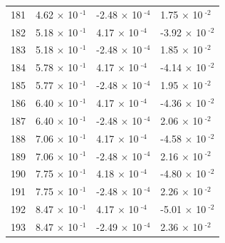 \documentclass[a4paper,11pt]{article}
\begin{document}
\begin{center}
\begin{longtable}{|R{1.5cm}|R{2.5cm}|R{2.5cm}|R{2.5cm}|}
  181 &         4.62 $\times$ 10$^{\text{          -1}}$  &        -2.48 $\times$ 10$^{\text{          -4}}$  &         1.75 $\times$ 10$^{\text{          -2}}$ \\ 
  182 &         5.18 $\times$ 10$^{\text{          -1}}$  &         4.17 $\times$ 10$^{\text{          -4}}$  &        -3.92 $\times$ 10$^{\text{          -2}}$ \\ 
  183 &         5.18 $\times$ 10$^{\text{          -1}}$  &        -2.48 $\times$ 10$^{\text{          -4}}$  &         1.85 $\times$ 10$^{\text{          -2}}$ \\ 
  184 &         5.78 $\times$ 10$^{\text{          -1}}$  &         4.17 $\times$ 10$^{\text{          -4}}$  &        -4.14 $\times$ 10$^{\text{          -2}}$ \\ 
  185 &         5.77 $\times$ 10$^{\text{          -1}}$  &        -2.48 $\times$ 10$^{\text{          -4}}$  &         1.95 $\times$ 10$^{\text{          -2}}$ \\ 
  186 &         6.40 $\times$ 10$^{\text{          -1}}$  &         4.17 $\times$ 10$^{\text{          -4}}$  &        -4.36 $\times$ 10$^{\text{          -2}}$ \\ 
  187 &         6.40 $\times$ 10$^{\text{          -1}}$  &        -2.48 $\times$ 10$^{\text{          -4}}$  &         2.06 $\times$ 10$^{\text{          -2}}$ \\ 
  188 &         7.06 $\times$ 10$^{\text{          -1}}$  &         4.17 $\times$ 10$^{\text{          -4}}$  &        -4.58 $\times$ 10$^{\text{          -2}}$ \\ 
  189 &         7.06 $\times$ 10$^{\text{          -1}}$  &        -2.48 $\times$ 10$^{\text{          -4}}$  &         2.16 $\times$ 10$^{\text{          -2}}$ \\ 
  190 &         7.75 $\times$ 10$^{\text{          -1}}$  &         4.18 $\times$ 10$^{\text{          -4}}$  &        -4.80 $\times$ 10$^{\text{          -2}}$ \\ 
  191 &         7.75 $\times$ 10$^{\text{          -1}}$  &        -2.48 $\times$ 10$^{\text{          -4}}$  &         2.26 $\times$ 10$^{\text{          -2}}$ \\ 
  192 &         8.47 $\times$ 10$^{\text{          -1}}$  &         4.17 $\times$ 10$^{\text{          -4}}$  &        -5.01 $\times$ 10$^{\text{          -2}}$ \\ 
  193 &         8.47 $\times$ 10$^{\text{          -1}}$  &        -2.49 $\times$ 10$^{\text{          -4}}$  &         2.36 $\times$ 10$^{\text{          -2}}$ \\ 

\end{longtable}
\end{center}
\end{document}
